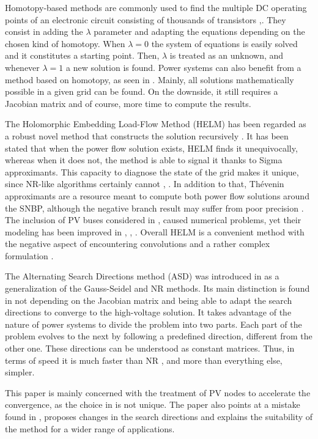 \documentclass[journal]{IEEEtran}
\begin{document}
Homotopy-based methods are commonly used to find the multiple DC operating points of an electronic circuit consisting of thousands of transistors \cite{yamamura},\cite{trajkovic}. They consist in adding the $\lambda$ parameter and adapting the equations depending on the chosen kind of homotopy. When $\lambda=0$ the system of equations is easily solved and it constitutes a starting point. Then, $\lambda$ is treated as an unknown, and whenever $\lambda=1$ a new solution is found. Power systems can also benefit from a method based on homotopy, as seen in \cite{mehta}. Mainly, all solutions mathematically possible in a given grid can be found. On the downside, it still requires a Jacobian matrix and of course, more time to compute the results.

The Holomorphic Embedding Load-Flow Method (HELM) has been regarded as a robust novel method that constructs the solution recursively \cite{Trias2012}. It has been stated that when the power flow solution exists, HELM finds it unequivocally, whereas when it does not, the method is able to signal it thanks to Sigma approximants. This capacity to diagnose the state of the grid makes it unique, since NR-like algorithms certainly cannot \cite{Trias2018}, \cite{Trias_sigma}. In addition to that, Thévenin approximants are a resource meant to compute both power flow solutions around the SNBP, although the negative branch result may suffer from poor precision \cite{Trias2018}. The inclusion of PV buses considered in \cite{Schmidt}, \cite{Subramanian} caused numerical problems, yet their modeling has been improved in \cite{Trias2018}, \cite{Rao}, \cite{subramanianPV}. Overall HELM is a convenient method with the negative aspect of encountering convolutions and a rather complex formulation \cite{Trias2018}.

The Alternating Search Directions method (ASD) was introduced in \cite{asd} as a generalization of the Gauss-Seidel and NR methods. Its main distinction is found in not depending on the Jacobian matrix and being able to adapt the search directions to converge to the high-voltage solution. It takes advantage of the nature of power systems to divide the problem into two parts. Each part of the problem evolves to the next by following a predefined direction, different from the other one. These directions can be understood as constant matrices. Thus, in terms of speed it is much faster than NR \cite{asd}, and more than everything else, simpler.

This paper is mainly concerned with the treatment of PV nodes to accelerate the convergence, as the choice in \cite{asd} is not unique. The paper also points at a mistake found in \cite{asd}, proposes changes in the search directions and explains the suitability of the method for a wider range of applications. 
\end{document}
